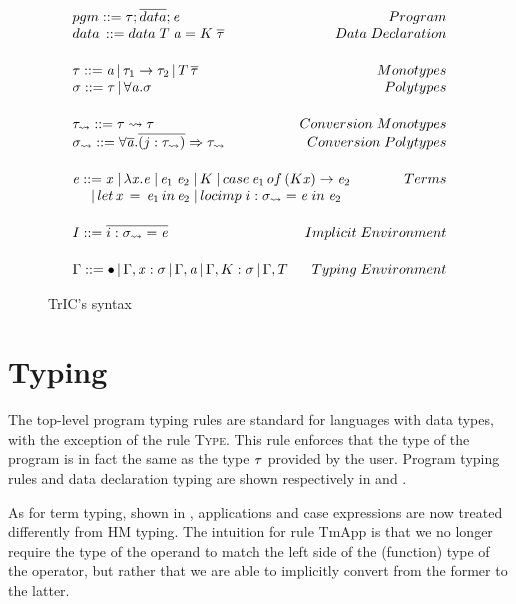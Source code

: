 \begin{figure}
   \[
\begin{array}{@{\hspace{0mm}}l@{\hspace{0mm}}}
  pgm ::= \type;\overline{data};\term\hfill Program\\
  data\,::= data\;T\;\tyVar=K\;\overline{\type}\hfill Data\;Declaration
  \\[5mm]
  \type ::= \tyVar\,|\,\type_1\to\type_2\,|\,T\,\overline{\type}\hfill Monotypes\\
  \typeS ::= \type\,|\,\forall\tyVar.\typeS\hfill Polytypes
  \\[5mm]
    \type_{\rightsquigarrow} ::= \type \rightsquigarrow \type\hfill Conversion\;Monotypes\\
  \typeS_{\rightsquigarrow} ::= \forall \overline {\tyVar} . \overline{(j : \type_{\rightsquigarrow})} \Rightarrow \type_{\rightsquigarrow}\hfill Conversion\;Polytypes
  \\[5mm]
  \term ::= \tmVar\;|\,\lambda \tmVar.\term\;|\,\term_1 \; \term_2\;|\, K \;|\, case \, \term_1 \, of\, (K \tmVar) \rightarrow \term_2 \hfill Terms\\
  \phantom{\term ::}|\, let \, \tmVar \, =\, \term_1 \,in\, \term_2  \;|\, locimp \; i : \typeS_{\rightsquigarrow}=\term\; in\; \term_2
  \\[5mm]
  \imEnv::=\overline{i : \typeS_{\rightsquigarrow}=\term} \hfill Implicit\;Environment
  \\[5mm]
  \tyEnv::=\bullet\,|\,\tyEnv,\tmVar:\typeS\,|\,\tyEnv,\tyVar\,|\,\tyEnv,K:\typeS\,|\,\tyEnv,T \hfill \phantom{xxx} Typing\; Environment

  \end{array}
\]
  \caption{TrIC's syntax}
  \label{mlsyntax}
\end{figure}

\section{Typing}
The top-level program typing rules are standard for languages with data types, with the exception of the rule \textsc{Type}. This rule enforces that the type of the program is in fact the same as the type $\mathit{\tau}$ provided by the user. Program typing rules and data declaration typing are shown respectively in  and .

As for term typing, shown in , applications and case expressions are now treated differently from HM typing. The intuition for rule TmApp is that we no longer require the type of the operand to match the left side of the (function) type of the operator, but rather that we are able to implicitly convert from the former to the latter.

